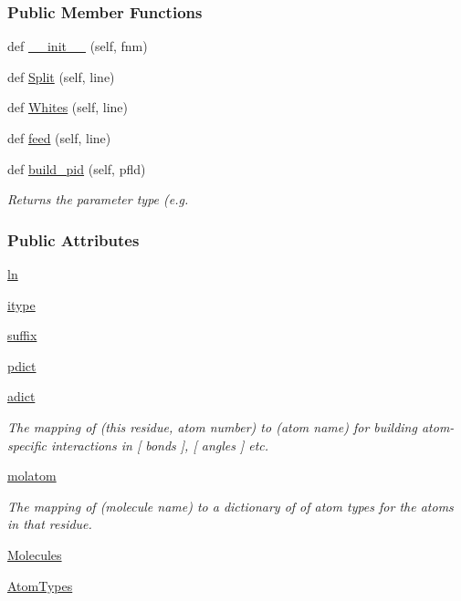 \subsubsection*{Public Member Functions}
\begin{DoxyCompactItemize}
\item 
def \hyperlink{classsrc_1_1BaseReader_a71de80aae79e75dea79b6038cb781915}{\+\_\+\+\_\+init\+\_\+\+\_\+} (self, fnm)
\item 
def \hyperlink{classsrc_1_1BaseReader_abe502aafac460a23f8594724a181c7d5}{Split} (self, line)
\item 
def \hyperlink{classsrc_1_1BaseReader_a749b5836039a78456d72f184d977568e}{Whites} (self, line)
\item 
def \hyperlink{classsrc_1_1BaseReader_a35f2a12d14c3b94e11fe85aa8013d959}{feed} (self, line)
\item 
def \hyperlink{classsrc_1_1BaseReader_a71385d420c4010876c06bc840d0f73db}{build\+\_\+pid} (self, pfld)
\begin{DoxyCompactList}\small\item\em Returns the parameter type (e.\+g. \end{DoxyCompactList}\end{DoxyCompactItemize}
\subsubsection*{Public Attributes}
\begin{DoxyCompactItemize}
\item 
\hyperlink{classsrc_1_1BaseReader_a7e0a1d1c74526b1e8f043590c0642eaa}{ln}
\item 
\hyperlink{classsrc_1_1BaseReader_a37bf0bb6679d767317e4fe3030987320}{itype}
\item 
\hyperlink{classsrc_1_1BaseReader_a424d95bfd19d90f0fb8e1ba228d3583b}{suffix}
\item 
\hyperlink{classsrc_1_1BaseReader_ac9cfd59b917771c7234cb36dd4c34048}{pdict}
\item 
\hyperlink{classsrc_1_1BaseReader_ad345ca9b16960d07f927d84f823aa75a}{adict}
\begin{DoxyCompactList}\small\item\em The mapping of (this residue, atom number) to (atom name) for building atom-\/specific interactions in \mbox{[} bonds \mbox{]}, \mbox{[} angles \mbox{]} etc. \end{DoxyCompactList}\item 
\hyperlink{classsrc_1_1BaseReader_af4802f985bc997673945070d37b15bb0}{molatom}
\begin{DoxyCompactList}\small\item\em The mapping of (molecule name) to a dictionary of of atom types for the atoms in that residue. \end{DoxyCompactList}\item 
\hyperlink{classsrc_1_1BaseReader_a86945517a0969c7a099c9aec850b9762}{Molecules}
\item 
\hyperlink{classsrc_1_1BaseReader_a4bb84fc28fa648fb0167bc7d90719095}{Atom\+Types}
\end{DoxyCompactItemize}


